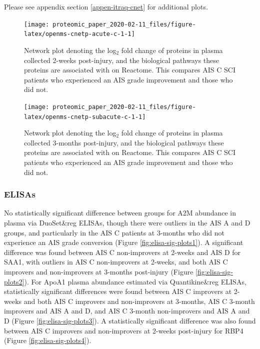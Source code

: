 \documentclass[9pt,lineno]{elife}
\begin{document}
Please see appendix section \ref{appen-itraq-cnet} for additional plots.

\begin{landscape}



\begin{figure}

{\centering \texttt{[image: proteomic\_paper\_2020-02-11\_files/figure-latex/openms-cnetp-acute-c-1-1]} 

}

\caption{Network plot denoting the log\(_2\) fold change of proteins in plasma collected 2-weeks post-injury, and the biological pathways these proteins are associated with on Reactome. This compares AIS C SCI patients who experienced an AIS grade improvement and those who did not.}\label{fig:openms-cnetp-acute-c-1}
\end{figure}

\end{landscape}
\begin{landscape}



\begin{figure}

{\centering \texttt{[image: proteomic\_paper\_2020-02-11\_files/figure-latex/openms-cnetp-subacute-c-1-1]} 

}

\caption{Network plot denoting the log\(_2\) fold change of proteins in plasma collected 3-months post-injury, and the biological pathways these proteins are associated with on Reactome. This compares AIS C SCI patients who experienced an AIS grade improvement and those who did not.}\label{fig:openms-cnetp-subacute-c-1}
\end{figure}

\end{landscape}

\clearpage

\hypertarget{elisas}{%
\subsubsection{ELISAs}\label{elisas}}

No statistically significant difference between groups for A2M abundance in plasma via DuoSet\&reg ELISAs, though there were outliers in the AIS A and D groups, and particularly in the AIS C patients at 3-months who did not experience an AIS grade conversion (Figure \ref{fig:elisa-sig-plots1}).
A significant difference was found between AIS C non-improvers at 2-weeks and AIS D for SAA1, with outliers in AIS C non-improvers at 2-weeks, and both AIS C improvers and non-improvers at 3-months post-injury (Figure \ref{fig:elisa-sig-plots2}).
For ApoA1 plasma abundance estimated via Quantikine\&reg ELISAs, statistically significant differences were found between AIS C improvers at 2-weeks and both AIS C improvers and non-improvers at 3-months, AIS C 3-month improvers and AIS A and D, and AIS C 3-month non-improvers and AIS A and D (Figure \ref{fig:elisa-sig-plots3}).
A statistically significant difference was also found between AIS C improvers and non-improvers at 2-weeks post-injury for RBP4 (Figure \ref{fig:elisa-sig-plots4}).
\end{document}
